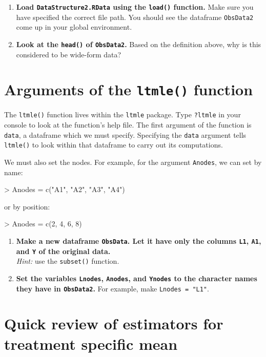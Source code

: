 \documentclass[answers]{exam}
\begin{document}
\begin{enumerate}
\item \textbf{Load \texttt{DataStructure2.RData} using the \texttt{load()} function.} Make sure you have specified the correct file path. You should see the dataframe \texttt{ObsData2} come up in your global environment.
\item \textbf{Look at the \texttt{head()} of \texttt{ObsData2}.} Based on the definition above, why is this considered to be wide-form data?
\end{enumerate}


\section{Arguments of the \texttt{ltmle()} function}

The \texttt{ltmle()} function lives within the \texttt{ltmle} package. Type \texttt{?ltmle} in your console to look at the function's help file. 
The first argument of the function is \texttt{data}, a dataframe which we must specify. Specifying the \texttt{data} argument tells \texttt{ltmle()} to look within that dataframe to carry out its computations. 

We must also set the nodes. For example, for the argument \texttt{Anodes}, we can set by name:
\begin{Schunk}
\begin{Sinput}
> Anodes = c("A1", "A2", "A3", "A4")
\end{Sinput}
\end{Schunk}
or by position:
\begin{Schunk}
\begin{Sinput}
> Anodes = c(2, 4, 6, 8)
\end{Sinput}
\end{Schunk}



\begin{enumerate}
\item \textbf{Make a new dataframe \texttt{ObsData}. Let it have only the columns \texttt{L1}, \texttt{A1}, and \texttt{Y} of the original data.} \\
\emph{Hint:} use the \texttt{subset()} function.
\item \textbf{Set the variables \texttt{Lnodes}, \texttt{Anodes}, and \texttt{Ynodes} to the character names they have in \texttt{ObsData2}.} For example, make \texttt{Lnodes = "L1"}.
\end{enumerate}

\section{Quick review of estimators for treatment specific mean}
\end{document}
